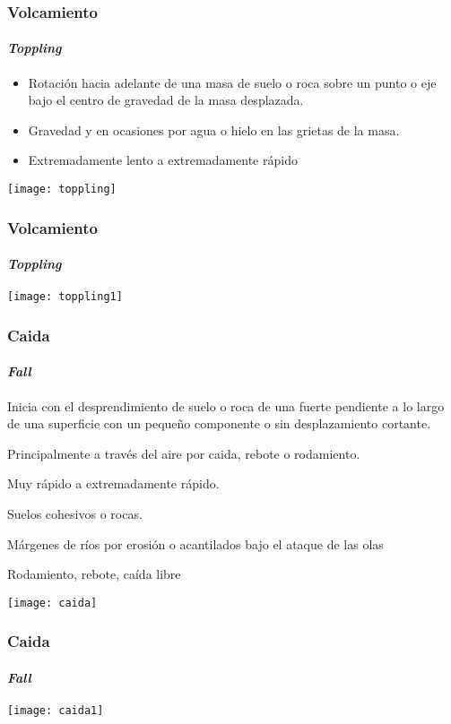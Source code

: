 \documentclass{beamer}
\begin{document}
\begin{frame}
\frametitle{Volcamiento}
\framesubtitle{\it{Toppling}}
\begin{itemize}
\item Rotación hacia adelante de una masa de suelo o roca sobre un punto o eje bajo el centro de gravedad de la masa desplazada.
\item Gravedad y en ocasiones por agua o hielo en las grietas de la masa.
\item Extremadamente lento a extremadamente rápido
\end{itemize}
\begin{center}
   	\texttt{[image: toppling]} 
\end{center}
\end{frame}
\begin{frame}
\frametitle{Volcamiento}
\framesubtitle{\it{Toppling}}
\begin{center}
   	\texttt{[image: toppling1]} 
\end{center}
\end{frame}
\begin{frame}
\frametitle{Caida}
\framesubtitle{\it{Fall}}
\begin{itemize}
\small{
\item Inicia con el desprendimiento de suelo o roca de una fuerte pendiente a lo largo de una superficie con un pequeño componente o sin desplazamiento cortante.
\item Principalmente a través del aire por caida, rebote o rodamiento.
\item Muy rápido a extremadamente rápido.
\item Suelos cohesivos o rocas.
\item Márgenes de ríos por erosión o acantilados bajo el ataque de las olas
\item Rodamiento, rebote, caída libre
}
\end{itemize}
\begin{center}
   	\texttt{[image: caida]} 
\end{center}
\end{frame}
\begin{frame}
\frametitle{Caida}
\framesubtitle{\it{Fall}}
\begin{center}
   	\texttt{[image: caida1]} 
\end{center}
\end{frame}
\end{document}
